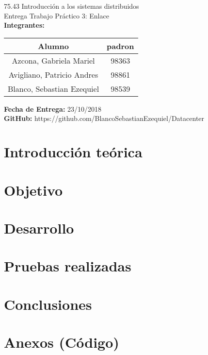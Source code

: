 \documentclass[a4paper, 12pt]{article}
\begin{document}
		
	\begin{titlepage}
		\vspace*{\fill}
		\begin{center}
			\Large 75.43 Introducción a los sistemas distribuidos \\
			\Huge Entrega Trabajo Práctico 3: Enlace \\
			\bigskip\bigskip\bigskip
			\large\textbf{Integrantes:} \\
			\begin{center}
				\begin{tabular}{||c | c||} 
					\hline
					Alumno & padron \\ [0.5ex] 
					\hline\hline
					Azcona, Gabriela Mariel & 98363 \\
					\hline
					Avigliano, Patricio Andres & 98861 \\
					\hline
					Blanco, Sebastian Ezequiel & 98539 \\
					\hline
				\end{tabular}
			\end{center}
			\textbf{Fecha de Entrega:} 23/10/2018\\
			\textbf{GitHub:} https://github.com/BlancoSebastianEzequiel/Datacenter\\

		\end{center}
		\vspace*{\fill}
	\end{titlepage}
	\newpage
			
	\tableofcontents
	\newpage
	\section{Introducción teórica}
	\section{Objetivo}
	\section{Desarrollo}
	\section{Pruebas realizadas}
	\section{Conclusiones}
	\section{Anexos (Código)}
\end{document}
